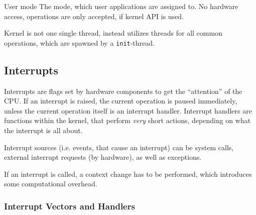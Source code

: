 \documentclass[english]{panikzettel}
\begin{document}
	\begin{defi}{User mode}
		The mode, which user applications are assigned to. No hardware access, operations are only accepted, if kernel API is used.
	\end{defi}
	
	Kernel is not one single thread, instead utilizes threads for all common operations, which are spawned by a \texttt{init}-thread.

	\subsection{Interrupts}
	\label{ss-interrupts}
	
	Interrupts are flags set by hardware components to get the \enquote{attention} of the CPU.
	If an interrupt is raised, the current operation is paused immediately, unless the current operation itself is an interrupt handler.
	Interrupt handlers are functions within the kernel, that perform \textit{very} short actions, depending on what the interrupt is all about. 
	
	Interrupt sources (i.e. events, that cause an interrupt) can be system calls, external interrupt requests (by hardware), as well as exceptions.

	If an interrupt is called, a context change has to be performed, which introduces some computational overhead.

	\subsubsection{Interrupt Vectors and Handlers}
	\label{sss-interrupt-vectors}
	
\end{document}
